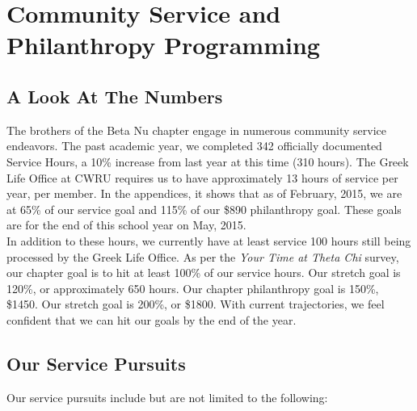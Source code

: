 \chapter{Community Service and Philanthropy Programming}

  \section*{A Look At The Numbers}
    The brothers of the Beta Nu chapter engage in numerous community service endeavors. The past academic year, we completed 342 officially documented Service Hours, a 10\% increase from last year at this time (310 hours). The Greek Life Office at CWRU requires us to have approximately 13 hours of service per year, per member. In the appendices, it shows that as of February, 2015, we are at 65\% of our service goal and 115\% of our \$890 philanthropy goal. These goals are for the end of this school year on May, 2015. \\
    
    In addition to these hours, we currently have at least service 100 hours still being processed by the Greek Life Office. As per the \textit{Your Time at Theta Chi} survey, our chapter goal is to hit at least 100\% of our service hours. Our stretch goal is 120\%, or approximately 650 hours. Our chapter philanthropy goal is 150\%, \$1450. Our stretch goal is 200\%, or \$1800. With current trajectories, we feel confident that we can hit our goals by the end of the year. 
    
    \section*{Our Service Pursuits}
      Our service pursuits include but are not limited to the following:
      
